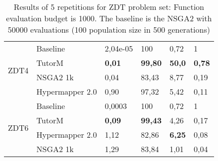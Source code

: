 \begin{table}[h]
{\begin{tabular}{@{}llllll@{}}
    \multirow{4}{*}{ZDT4} & Baseline       & 2,04e-05          & 100            & 0,72           & 1             \\ \cmidrule(l){2-6} 
                          & TutorM          & \textbf{0,01}     & \textbf{99,80} & \textbf{50,0}  & \textbf{0,78} \\ \cmidrule(l){2-6} 
                          & NSGA2 1k        & 0,04              & 83,43          & 8,77           & 0,19          \\ \cmidrule(l){2-6} 
                          & Hypermapper 2.0 & 0,90              & 97,32          & 5,42           & 0,11          \\ \midrule
    \multirow{4}{*}{ZDT6} & Baseline       & 0,0003            & 100            & 0,72           & 1             \\ \cmidrule(l){2-6} 
                          & TutorM          & \textbf{0,09}     & \textbf{99,43} & 4,26           & 0,17          \\ \cmidrule(l){2-6} 
                          & Hypermapper 2.0 & 1,12              & 82,86          & \textbf{6,25}  & 0,08          \\ \cmidrule(l){2-6} 
                          & NSGA2 1k        & 1,29              & 83,84          & 1,01           & 0,04          \\ \bottomrule
    \end{tabular}%
    }
    \caption{Results of 5 repetitions for ZDT problem set: Function evaluation budget is 1000. The baseline is the NSGA2 with 50000 evaluations (100 population size in 500 generations)}
    \label{tab:zdt_summary}
    \end{table}